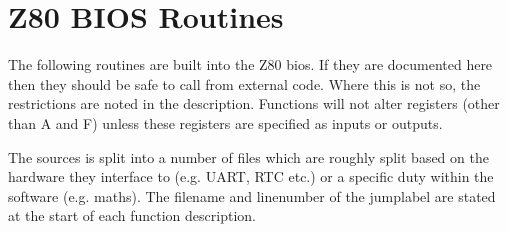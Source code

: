 \documentclass[a4paper,10pt]{book}
\begin{document}
\chapter{Z80 BIOS Routines}
The following routines are built into the Z80 bios.  If they are documented here
then they should be safe to call from external code.  Where this is not so, the
restrictions are noted in the description.  Functions will not alter registers
(other than A and F) unless these registers are specified as inputs or outputs.

The sources is split into a number of files which are roughly split based on the
hardware they interface to (e.g. UART, RTC etc.) or a specific duty within the
software (e.g. maths).  The filename and linenumber of the jumplabel are stated
at the start of each function description.


\end{document}
